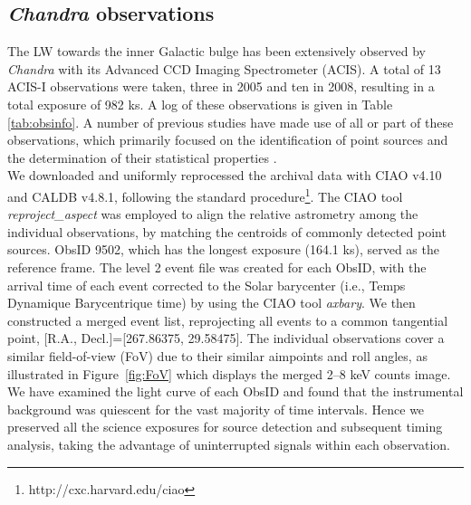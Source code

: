 \documentclass[twoside,twocolumn]{aastex63}
\begin{document}
\subsection{{\it Chandra} observations} \label{subsec:xdata}
The LW towards the inner Galactic bulge has been extensively observed by {\it Chandra} with its Advanced CCD Imaging Spectrometer (ACIS).
A total of 13 ACIS-I observations were taken, three in 2005 and ten in 2008, resulting in a total exposure of 982 ks.
A log of these observations is given in Table \ref{tab:obsinfo}. 
A number of previous studies have made use of all or part of these observations, which primarily focused on the identification of point sources and the determination of their statistical properties \citep{2009Natur.458.1142R,2009ApJ...700.1702V,2009ApJ...706..223H,2011MNRAS.414..495R,2012MNRAS.427.1633H,2013ApJ...766...14M,2016MNRAS.462L.106W}.
\\

We downloaded and uniformly reprocessed the archival data with CIAO v4.10 and CALDB v4.8.1, following the standard procedure\footnote{http://cxc.harvard.edu/ciao}.
The CIAO tool \emph{reproject\_aspect} was employed to align the relative astrometry among the individual observations, by matching the centroids of commonly detected point sources. ObsID 9502, which has the longest exposure (164.1 ks), served as the reference frame.
The level 2 event file was created for each ObsID, with the arrival time of each event corrected to the Solar barycenter (i.e., Temps Dynamique Barycentrique time) by using the CIAO tool \emph{axbary}.
We then constructed a merged event list, reprojecting all events to a common tangential point, [R.A., Decl.]=[267.86375, 29.58475].
The individual observations cover a similar field-of-view (FoV) due to their similar aimpoints and roll angles, as illustrated in Figure~\ref{fig:FoV} which displays the merged 2--8 keV counts image.
We have examined the light curve of each ObsID and found that the instrumental background was quiescent for the vast majority of time intervals.
Hence we preserved all the science exposures for source detection and subsequent timing analysis, taking the advantage of uninterrupted signals within each observation.  
\\
\end{document}
